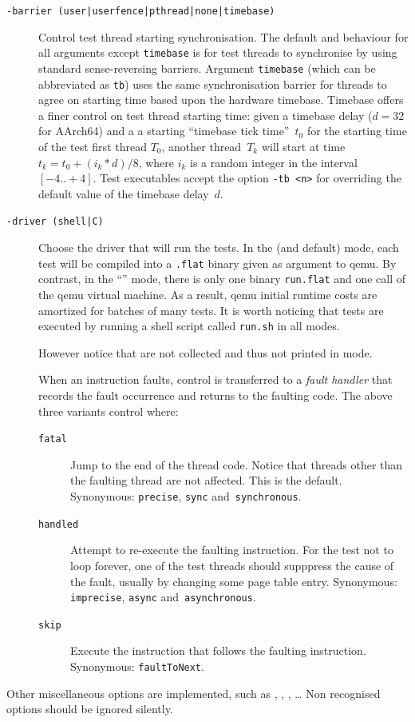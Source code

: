 \begin{description}
\item[{\tt -barrier (user|userfence|pthread|none|timebase)}]
Control test thread starting synchronisation. The default and
behaviour for all arguments except \texttt{timebase} is for test
threads to synchronise by using
standard 
{sense-reversing barriers}. Argument \texttt{timebase} (which can be abbreviated
as \texttt{tb}) uses the same synchronisation barrier for threads to
agree on starting time based upon the hardware timebase. Timebase
offers a finer control on test thread starting time: given a timebase
delay ($d=32$ for AArch64) and a a starting ``timebase tick
time''~$t_0$ for the starting time of the test first thread $T_0$,
another thread~$T_k$ will start at time $t_k = t_0+(i_k*d)/8$, where
$i_k$ is a random integer in the interval $[-4..+4]$. Test executables
accept the option \texttt{-tb <n>} for overriding the default value
of the timebase delay~$d$.

\item[{\tt -driver (shell|C)}] Choose the driver that will run the tests.
In the  (and default) mode, each test will be compiled into
a \texttt{.flat} binary given as argument to qemu. By contrast, in the
``'' mode, there is only one binary \texttt{run.flat} and one
call of the qemu virtual machine. As a result, qemu initial runtime
costs are amortized for batches of many tests. It is worth noticing
that tests are executed by running a shell script called
\texttt{run.sh} in all modes.

However notice that 
are not collected and thus not  printed in  mode.

\item[] When
an instruction faults, control is transferred to a \emph{fault
handler} that records the fault occurrence and returns to the faulting
code. The above three variants control where:
\begin{description}
\item[{\tt fatal}] Jump to the end of the thread code. Notice that
threads other than the faulting thread are not
affected. This is the default.
Synonymous: \texttt{precise}, \texttt{sync} and~\texttt{synchronous}.
\item[{\tt handled}] Attempt to re-execute the faulting
instruction. For the test not to loop forever, one of the test threads
should supppress the cause of the fault, usually by changing some page
table entry.
Synonymous: \texttt{imprecise}, \texttt{async}  and~\texttt{asynchronous}.
\item[{\tt skip}] Execute the instruction that follows the faulting
instruction. Synonymous: \texttt{faultToNext}.
\end{description}
\end{description}
Other miscellaneous options are implemented, such
as ,
,
,
\ldots{}
Non recognised options should be ignored silently.
